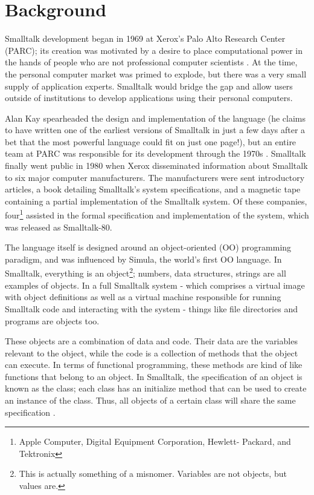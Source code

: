 \section{Background}

Smalltalk development began in 1969 at Xerox's Palo Alto Research
Center (PARC); its creation was motivated by a desire to place
computational power in the hands of people who are not professional
computer scientists \cite{bitsandpieces}. At the time, the personal
computer market was primed to explode, but there was a very small
supply of application experts. Smalltalk would bridge the gap and
allow users outside of institutions to develop applications using
their personal computers.

Alan Kay spearheaded the design and implementation of the language (he
claims to have written one of the earliest versions of Smalltalk in
just a few days after a bet that the most powerful language could fit
on just one page!), but an entire team at PARC was responsible for its
development through the 1970s \cite{alankay}. Smalltalk finally went
public in 1980 when Xerox disseminated information about Smalltalk to
six major computer manufacturers. The manufacturers were sent
introductory articles, a book detailing Smalltalk's system
specifications, and a magnetic tape containing a partial
implementation of the Smalltalk system. Of these companies,
four\footnote{Apple Computer, Digital Equipment Corporation, Hewlett-
Packard, and Tektronix} assisted in the formal specification and
implementation of the system, which was released as Smalltalk-80.

The language itself is designed around an object-oriented (OO)
programming paradigm, and was influenced by Simula, the world's first
OO language. In Smalltalk, everything is an object\footnote{This is
actually something of a misnomer. Variables are not objects, but
values are.}; numbers, data structures, strings are all examples of
objects.  In a full Smalltalk system - which comprises a virtual image
with object definitions as well as a virtual machine responsible for
running Smalltalk code and interacting with the system - things like
file directories and programs are objects too.

These objects are a combination of data and code. Their data are the
variables relevant to the object, while the code is a collection of
methods that the object can execute. In terms of functional
programming, these methods are kind of like functions that belong to
an object. In Smalltalk, the specification of an object is known as
the class; each class has an initialize method that can be used to
create an instance of the class. Thus, all objects of a certain class
will share the same specification \cite{thebluebook}.

